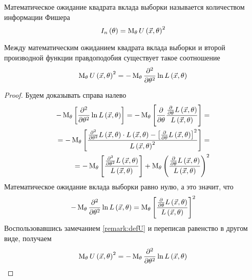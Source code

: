 \begin{definition}
  \label{def:fisherInformation}
  Математическое ожидание квадрата вклада выборки называется
  количеством информации Фишера
  $$I_n\left(\theta\right)=
    \operatorname{M}_{\theta} U\left( \vec{x},\theta \right)^2$$
\end{definition}
\begin{remark}
  Между математическим ожиданием квадрата вклада выборки и второй производной
  функции правдоподобия существует такое соотношение
  \begin{equation*}
    \operatorname{M}_{\theta} U\left( \vec{x},\theta \right)^2
    = - \operatorname{M}_{\theta} 
      \frac{\partial^2}{\partial\theta^2}
      \ln{L\left( \vec{x},\theta \right)}
  \end{equation*}
\end{remark}
\begin{proof}
  Будем доказывать справа налево
  \begin{align*}
  - \operatorname{M}_{\theta} \left[ 
    \frac{\partial^2}{\partial \theta^2}
    \ln{L\left( \vec{x}, \theta \right)} \right]
  = - \operatorname{M}_{\theta} \left[ 
    \frac{\partial}{\partial\theta}
    \frac{\frac{\partial}{\partial\theta}L\left(\vec{x},\theta\right)}
      {L\left(\vec{x},\theta\right)} \right] = \\
  = -\operatorname{M}_{\theta} \left[ 
    \frac{\frac{\partial^2}{\partial\theta^2}
      L\left(\vec{x},\theta\right)\cdot L\left(\vec{x},\theta\right)-
        \left[\frac{\partial}{\partial\theta}
          L\left(\vec{x},\theta\right)\right]^2
      }
      {L\left(\vec{x},\theta\right)^2} \right] = \\
  = - \operatorname{M}_{\theta} \left[ 
    \frac{\frac{\partial^2}{\partial\theta^2}
      L\left(\vec{x},\theta\right)}
      {L\left(\vec{x},\theta\right)} \right]
    + \operatorname{M}_{\theta} 
      \left(\frac{\frac{\partial}{\partial\theta}
        L\left(\vec{x},\theta\right)}
        {L\left(\vec{x},\theta\right)}\right)^2
  \end{align*}
  Математическое ожидание вклада выборки равно нулю, а это значит, что
  \begin{equation*}
   - \operatorname{M}_{\theta} \frac{\partial^2}{\partial\theta^2}
      \ln{L\left( \vec{x},\theta \right)}
   = \operatorname{M}_{\theta} \left[\frac{\frac{\partial}{\partial\theta}
      L\left(\vec{x},\theta\right)}{L\left(\vec{x},\theta\right)}\right]^2
  \end{equation*}
  Воспользовавшись замечанием \ref{remark:defU} и переписав равенство в другом
  виде, получаем
  \begin{equation*}
    \operatorname{M}_{\theta} U\left( \vec{x},\theta \right)^2
    = - \operatorname{M}_{\theta} 
      \frac{\partial^2}{\partial\theta^2}
      \ln{L\left( \vec{x},\theta \right)}
  \end{equation*}
\end{proof}


